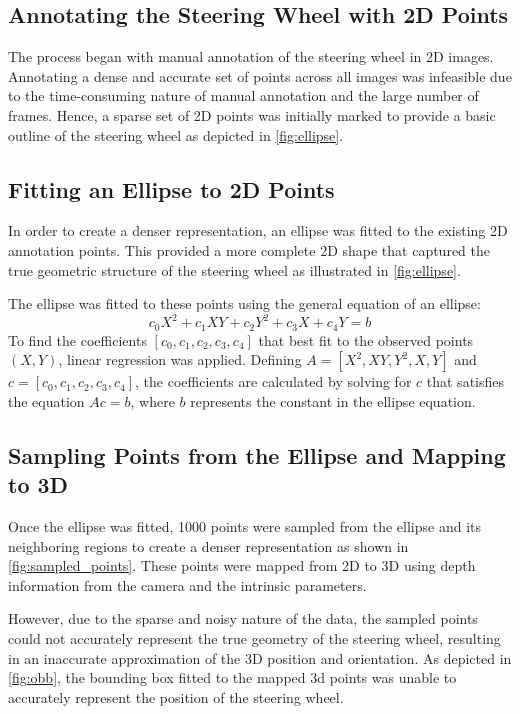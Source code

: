 \subsection{Annotating the Steering Wheel with 2D Points}
The process began with manual annotation of the steering wheel 
in 2D images. Annotating a dense and accurate set of points 
across all images was infeasible due to the time-consuming 
nature of manual annotation and the large number of frames. 
Hence, a sparse set of 2D points was initially marked to 
provide a basic outline of the steering wheel as depicted in 
\cref{fig:ellipse}.

\subsection{Fitting an Ellipse to 2D Points}
In order to create a denser representation, an ellipse was fitted to the existing 2D annotation points. This provided 
a more complete 2D shape that captured the true geometric 
structure of the steering wheel as illustrated in \cref{fig:ellipse}. 

The ellipse was fitted to these points using the general equation of an ellipse:
\[
c_0 X^2 + c_1 XY + c_2 Y^2 + c_3 X + c_4 Y = b
\]
To find the coefficients \([c_0, c_1, c_2, c_3, c_4]\) 
that best fit to the observed points \((X, Y)\), linear 
regression was applied. Defining \( A = [X^2, XY, Y^2, X, Y] \) and 
\( c = [c_0, c_1, c_2, c_3, c_4] \), the coefficients are calculated 
by solving for \( c \) that satisfies the equation \( Ac = b \), 
where \( b \) represents the constant in the ellipse equation. 


\subsection{Sampling Points from the Ellipse and Mapping to 3D}
Once the ellipse was fitted, 1000 points were sampled from 
the ellipse and its neighboring regions to create a denser 
representation as shown in \cref{fig:sampled_points}. These points were mapped from 2D to 3D using 
depth information from the camera and the intrinsic parameters.

However, due to the sparse and noisy nature of the data, 
the sampled points could not accurately represent the true 
geometry of the steering wheel, resulting in an inaccurate 
approximation of the 3D position and orientation. 
As depicted in \cref{fig:obb}, the bounding box fitted to the 
mapped 3d points was unable to accurately represent the 
position of the steering wheel.

